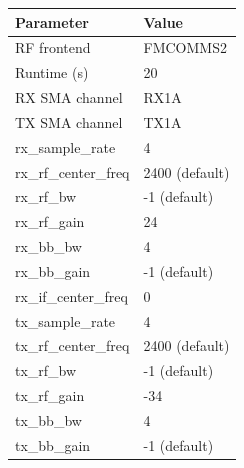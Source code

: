 \begin{tabular}{|l|l|}
\hline
\rowcolor{blue}
Parameter 	&        Value  	\\
\hline
RF frontend 	&        FMCOMMS2             	\\
\hline
Runtime (s) 	&        20 	        \\
\hline
RX SMA channel 	&        RX1A              	\\
\hline
TX SMA channel 	&        TX1A           	\\
\hline
rx\_sample\_rate 	&4 	                \\
\hline
rx\_rf\_center\_freq 	&2400 (default)  	\\
\hline
rx\_rf\_bw 	&        -1 (default)   \\
\hline
rx\_rf\_gain 	&        24       	\\
\hline
rx\_bb\_bw 	&        4 	        \\
\hline
rx\_bb\_gain 	&        -1 (default) 	\\
\hline
rx\_if\_center\_freq 	&0              	\\
\hline
tx\_sample\_rate 	&4              	\\
\hline
tx\_rf\_center\_freq 	&2400 (default)\\
\hline
tx\_rf\_bw 	&        -1 (default)   \\
\hline
tx\_rf\_gain 	&        -34 	        \\
\hline
tx\_bb\_bw 	&        4        	\\
\hline
tx\_bb\_gain    &       -1 (default) \\
\hline
\end{tabular}\par\medskip

